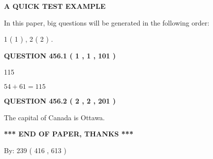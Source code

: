 \documentclass[12pt]{article}
\begin{document}
   
   
   
   
   
 \vspace{0.2in}
{\LARGE {\textbf{ A QUICK TEST EXAMPLE}}}
   
   
   
\vspace{0.2in}
   
In this paper, big questions will be generated in the following order: 
   
   
   1 ( 1 )
 ,
   2 ( 2 )
 .
  
\vspace{0.2in}
  
{\textbf{\Large{QUESTION
456.1 
 ( 1 , 1 , 101 )
}}}
  
  
 
 
\noindent{}

115
 
 
 
 
\noindent{}

$ %
54 +  %
61=   %
115$
 
 
  
\vspace{0.2in}
  
{\textbf{\Large{QUESTION
456.2 
 ( 2 , 2 , 201 )
}}}
  
  
 
 
\noindent{}
 
 
The capital of Canada is Ottawa.
 
 
 
 
   
   
 \vspace{0.2in}
 
   
   
   
   
\vspace{1.0in} 
{\textbf{\large{ *** END OF PAPER, THANKS *** }}} 
   
   
\hspace{1.0in} By: 
 239 ( 416 ,  613 )
   
   
   
   
\newpage 
\setcounter{page}{ 
   457001 } 
   
\end{document}
